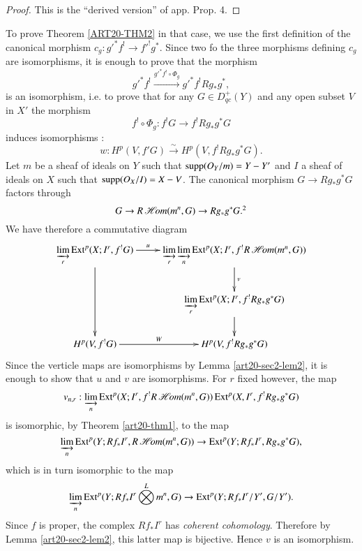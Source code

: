 \begin{proof}
This is the ``derived version'' of \cite{art20-key1} app. Prop. 4.
\end{proof}

To prove Theorem \ref{ART20-THM2} in that case, we use the first definition of the canonical morphism $c_{g}:{g'}^{*}f^{!}\to {f'}^{!}g^{*}$. Since two fo the three morphisms defining $c_{g}$ are isomorphisms, it is enough to prove that the morphism
$$
{g'}^{*}f^{!}\xrightarrow{{g'}^{*}f^{!}\circ \Phi_{g}}{g'}^{*}f^{!}Rg_{*}g^{*},
$$
is an isomorphism, i.e. to prove that for any $G\in D^{+}_{qc}(Y)$ and any open subset $V$ in $X'$ the morphism
$$
f^{!}\circ \Phi_{g}:f^{!}G\to f^{!}Rg_{*}g^{*}G
$$
induces isomorphisms :
$$
w:H^{p}(V,{f'}G)\xrightarrow{\sim}H^{p}(V,f^{!}Rg_{*}g^{*}G).
$$
Let $m$ be a sheaf of ideals on $Y$ such that $\operatorname{\mathrm{supp}}(O_{Y}/m)=Y-Y'$ and $I$ a sheaf of ideals on $X$ such that $\operatorname{\mathrm{supp}}(O_{X}/I)=X-V$. The canonical morphism $G\to Rg_{*}g^{*}G$ factors through
$$
G\to R\scrHom(m^{n},G)\to Rg_{*}g^{*}G.\footnotemark[2]
$$
We have therefore a commutative diagram
\[
\xymatrix{
\varinjlim\limits_{r}\Ext^{p}(X;I^{r},f^{!}G)\ar[dd]\ar[r]^-{u} & \varinjlim\limits_{r}\varinjlim\limits_{n}\Ext^{p}(X;I^{r},f^{!}R\scrHom(m^{n},G))\ar[d]^-{v}\\
 & \varinjlim\limits_{r}\Ext^{p}(X;I^{r},f^{!}Rg_{*}g^{*}G)\ar[d]\\
H^{p}(V,f^{!}G)\ar[r]^-{W} & H^{p}(V,f^{!}Rg_{*}g^{*}G)
}
\]\pageoriginale
Since the verticle maps are isomorphisms by Lemma \ref{art20-sec2-lem2}, it is enough to show that $u$ and $v$ are isomorphisms. For $r$ fixed however, the map
$$
v_{n,r}:\varinjlim_{n}\operatorname{\mathrm{Ext}}^{p}(X;I^{r},f^{!}R\operatorname{\mathscr{H}\!\textit{om}}(m^{n},G))\operatorname{\mathrm{Ext}}^{p}(X,I^{r},f^{!}Rg_{*}g^{*}G)
$$
is isomorphic, by Theorem \ref{art20-thm1}, to the map
$$
\varinjlim_{n}\operatorname{\mathrm{Ext}}^{p}(Y;Rf_{*}I^{r},R\operatorname{\mathscr{H}\!\textit{om}}(m^{n},G))\to \operatorname{\mathrm{Ext}}^{p}(Y;Rf_{*}I^{r},Rg_{*}g^{*}G),
$$
which is in turn isomorphic to the map
$$
\varinjlim_{n}\operatorname{\mathrm{Ext}}^{p}(Y;Rf_{*}I^{r}\bigotimes\limits^{L}m^{n},G)\to \operatorname{\mathrm{Ext}}^{p}(Y;Rf_{*}I^{r}/Y',G/Y').
$$
Since $f$ is proper, the complex $Rf_{*}I^{r}$ has {\em coherent cohomology}. Therefore by Lemma \ref{art20-sec2-lem2}, this latter map is bijective. Hence $v$ is an isomorphism.

